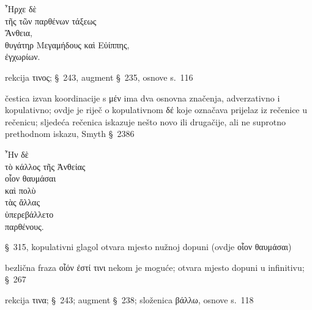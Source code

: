 
{\large
\begin{greek}
\noindent ῏Ηρχε δὲ \\
\tabto{2em} τῆς τῶν παρθένων τάξεως\\
Ἄνθεια,\\
\tabto{2em} θυγάτηρ Μεγαμήδους καὶ Εὐίππης, \\
\tabto{4em} ἐγχωρίων. \\

\end{greek}
}

\begin{description}[noitemsep]
\item[῏Ηρχε] rekcija τινος; §~243, augment §~235, osnove s.~116
\item[δὲ] čestica izvan koordinacije s μέν ima dva osnovna značenja, adverzativno i kopulativno; ovdje je riječ o kopulativnom δέ koje označava prijelaz iz rečenice u rečenicu; sljedeća rečenica iskazuje nešto novo ili drugačije, ali ne suprotno prethodnom iskazu, Smyth §~2386

\end{description}

{\large
\begin{greek}
\noindent ῏Ην δὲ \\
\tabto{2em} τὸ κάλλος τῆς Ἀνθείας \\
\tabto{2em} οἷον θαυμάσαι \\
\tabto{2em} καὶ πολὺ \\
\tabto{4em} τὰς ἄλλας \\
\tabto{2em} ὑπερεβάλλετο \\
\tabto{4em} παρθένους.\\

\end{greek}
}

\begin{description}[noitemsep]
\item[῏Ην] §~315, kopulativni glagol otvara mjesto nužnoj dopuni (ovdje οἷον θαυμάσαι)
\item[οἷον θαυμάσαι] bezlična fraza οἷόν ἐστί τινι nekom je moguće; otvara mjesto dopuni u infinitivu; §~267
\item[ὑπερεβάλλετο] rekcija τινα; §~243; augment §~238; složenica βάλλω, osnove s.~118

\end{description}

